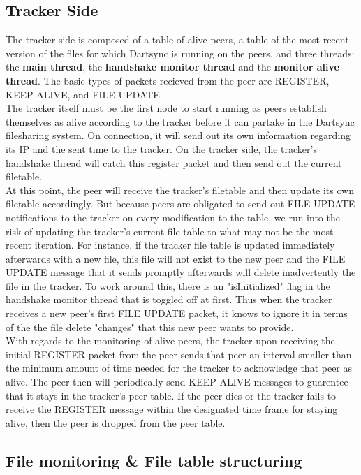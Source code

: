 \documentclass[12pt]{article}
\begin{document}
\subsection {Tracker Side} 
\indent\indent The tracker side is composed of a table of alive peers, a table of the most recent version of the files for which Dartsync is running on the peers, and three threads: the \textbf{main thread}, the \textbf{handshake monitor thread} and the \textbf{monitor alive thread}. The basic types of packets recieved from the peer are REGISTER, KEEP ALIVE, and FILE UPDATE.\\
\indent The tracker itself must be the first node to start running as peers establish themselves as alive according to the tracker before it can partake in the Dartsync filesharing system. On connection, it will send out its own information regarding its IP and the sent time to the tracker. On the tracker side, the tracker's handshake thread will catch this register packet and then send out the current filetable. \\
\indent At this point, the peer will receive the tracker's filetable and then update its own filetable accordingly. But because peers are obligated to send out FILE UPDATE notifications to the tracker on every modification to the table, we run into the risk of updating the tracker's current file table to what may not be the most recent iteration. For instance, if the tracker file table is updated immediately afterwards with a new file, this file will not exist to the new peer and the FILE UPDATE message that it sends promptly afterwards will delete inadvertently the file in the tracker. To work around this, there is an "isInitialized" flag in the handshake monitor thread that is toggled off at first. Thus when the tracker receives a new peer's first FILE UPDATE packet, it knows to ignore it in terms of the the file delete "changes" that this new peer wants to provide. \\
\indent With regards to the monitoring of alive peers, the tracker upon receiving the initial REGISTER packet from the peer sends that peer an interval smaller than the minimum amount of time needed for the tracker to acknowledge that peer as alive. The peer then will periodically send KEEP ALIVE messages to guarentee that it stays in the tracker's peer table. If the peer dies or the tracker fails to receive the REGISTER message within the designated time frame for staying alive, then the peer is dropped from the peer table.


\subsection {File monitoring \& File table structuring}
\end{document}
